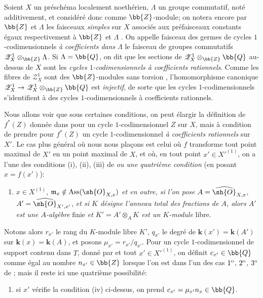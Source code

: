 \begin{env}[21.10.9]
Soient $X$ un préschéma localement noethérien, $\Lambda$ un groupe commutatif, noté additivement, et considéré donc comme $\bb{Z}$-module;
on notera encore par $\bb{Z}$ et $\Lambda$ les faisceaux \emph{simples} sur $X$ associés aux préfaisceaux constants égaux respectivement à $\bb{Z}$ et $\Lambda$ .
On appelle faisceau des germes de cycles $1$-codimensionnels \emph{à coefficients dans} $\Lambda$ le faisceau de groupes commutatifs $\mathscr{Z}^1_X\otimes_{\bb{Z}}\Lambda$.
Si $\Lambda=\bb{Q}$, on dit que les sections
de $\mathscr{Z}^1_X\otimes_{\bb{Z}}\bb{Q}$ au-dessus de $X$ sont les \emph{cycles $1$-codimensionnels à coefficients rationnels}.
Comme les fibres de $\mathscr{Z}^1_X$ sont des $\bb{Z}$-modules sans torsion , l'homomorphisme canonique $\mathscr{Z}^1_X\to\mathscr{Z}^1_X\otimes_{\bb{Z}}\bb{Q}$ est \emph{injectif}, de sorte que les cycles $1$-codimensionnels s'identifient à des cycles $1$-codimensionnels à coefficients rationnels.
\end{env}

\begin{env}[21.10.10]
\label{IV.21.10.10}
Nous allons voir que sous certaines conditions, on peut élargir la définition de $f^*(Z)$ donnée dans  pour un cycle $1$-codimensionnel $Z$ sur $X$, mais à condition de prendre pour $f^*(Z)$ un cycle $1$-codimensionnel \emph{à coefficients rationnels} sur $X'$.
Le cas plus général où nous nous plaçons est celui où $f$ transforme tout point maximal de $X'$ en un point maximal de $X$, et où, en tout point $x'\in X'^{(1)}$, on a l'une des conditions (i), (ii), (iii) de  \emph{ou une quatrième condition} (en posant $x=f(x')$):
\begin{enumerate}
  \item[(iv)] $x\in X^{(1)}$, $\mathfrak{m}_x\notin\operatorname{Ass}(\sh{O}_{X,x})$ \emph{et en outre, si l'on pose} $A=\widehat{\sh{O}}_{X,x}$, $A'=\widehat{\sh{O}}_{X',x'}$, \emph{et si $K$ désigne l'anneau total des fractions de $A$, alors $A'$ est une $A$-algèbre} finie \emph{et $K'=A'\otimes_AK$ est un $K$-module} libre.
\end{enumerate}

Notons alors $r_{x'}$ le rang du $K$-module libre $K'$, $q_{x'}$ le degré de $\boldsymbol{k}(x')=\boldsymbol{k}(A')$ sur $\boldsymbol{k}(x)=\boldsymbol{k}(A)$, et posons $\mu_{x'}=r_{x'}/q_{x'}$.
Pour un cycle $1$-codimensionnel de support contenu dans $T$, donné par  et tout $x'\in X'^{(1)}$, on définit $c_{x'}\in\bb{Q}$ comme égal au nombre $n_{x'}\in\bb{Z}$ lorsque l'on est dans l'un des cas $1\textsuperscript{o}$, $2\textsuperscript{o}$, $3\textsuperscript{o}$ de ; mais il reste ici une quatrième possibilité:
\begin{enumerate}
  \item[$4\textsuperscript{o}$] si $x'$ vérifie la condition (iv) ci-dessus, on prend $c_{x'}=\mu_{x'}n_x\in\bb{Q}$.
\end{enumerate}
\end{env}

